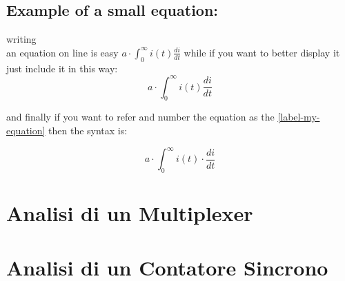 \subsection{Example of a small equation:}

writing \\
an equation on line is easy $a \cdot \int^{\infty}_0 i(t)
\frac{di}{dt}$
while if you want to better display it just include it in this way:
$$a \cdot \int^{\infty}_0 i(t) \frac{di}{dt}$$

and finally if you want to refer and number the equation as the
\ref{label-my-equation} then the syntax is:

\begin{equation}
a \cdot \int^{\infty}_0 i(t) \cdot \frac{di}{dt}
\label{label-my-equation}
\end{equation}

\section{Analisi di un Multiplexer}



\section{Analisi di un Contatore Sincrono}

